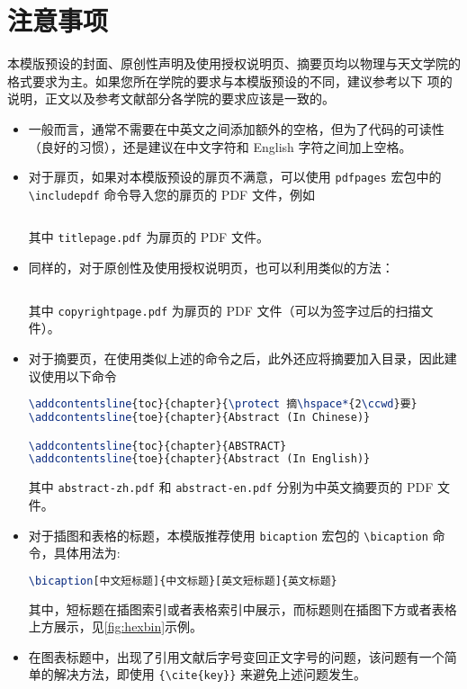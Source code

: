 \section{注意事项}

本模版预设的封面、原创性声明及使用授权说明页、摘要页均以物理与天文学院的格式要求为主。如果您所在学院的要求与本模版预设的不同，建议参考以下 \textdagger 项的说明，正文以及参考文献部分各学院的要求应该是一致的。

\begin{itemize}
    \item 一般而言，通常不需要在中英文之间添加额外的空格，但为了代码的可读性（良好的习惯），还是建议在中文字符和 English 字符之间加上空格。
    \item[\textdagger] 对于扉页，如果对本模版预设的扉页不满意，可以使用 \texttt{pdfpages} 宏包中的 \texttt{\textbackslash includepdf} 命令导入您的扉页的 PDF 文件，例如
\begin{lstlisting}[language=TeX]
% \maketitle

\end{lstlisting}
    其中 \texttt{titlepage.pdf} 为扉页的 PDF 文件。
    \item[\textdagger] 同样的，对于原创性及使用授权说明页，也可以利用类似的方法：
\begin{lstlisting}[language=TeX]
% \makecopyright

\end{lstlisting}
    其中 \texttt{copyrightpage.pdf} 为扉页的 PDF 文件（可以为签字过后的扫描文件）。
    \item[\textdagger] 对于摘要页，在使用类似上述的命令之后，此外还应将摘要加入目录，因此建议使用以下命令
\begin{lstlisting}[language=TeX]
% 
\addcontentsline{toc}{chapter}{\protect 摘\hspace*{2\ccwd}要}
\addcontentsline{toe}{chapter}{Abstract (In Chinese)}

\addcontentsline{toc}{chapter}{ABSTRACT}
\addcontentsline{toe}{chapter}{Abstract (In English)}

\end{lstlisting}
    其中 \texttt{abstract-zh.pdf} 和 \texttt{abstract-en.pdf} 分别为中英文摘要页的 PDF 文件。
    \item 对于插图和表格的标题，本模版推荐使用 \texttt{bicaption} 宏包的 \texttt{\textbackslash bicaption} 命令，具体用法为:
\begin{lstlisting}[language=TeX]
\bicaption[中文短标题]{中文标题}[英文短标题]{英文标题}
\end{lstlisting}
    其中，短标题在插图索引或者表格索引中展示，而标题则在插图下方或者表格上方展示，见\ref{fig:hexbin}示例。
    \item 在图表标题中，出现了引用文献后字号变回正文字号的问题，该问题有一个简单的解决方法，即使用 \texttt{\{\textbackslash cite\{key\}\}} 来避免上述问题发生。
\end{itemize}

